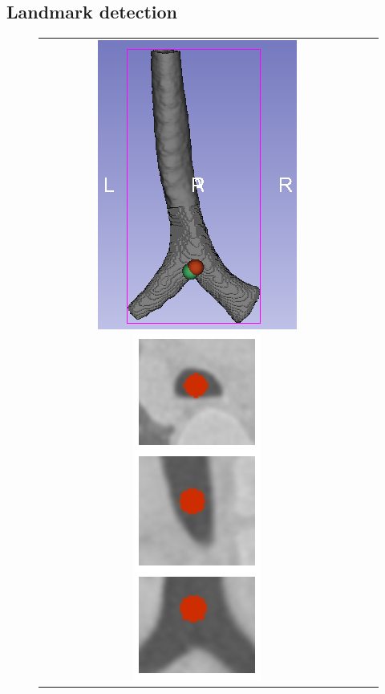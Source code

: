 \subsection{Landmark detection}
\label{sec:landmark_detection}
\begin{figure}[tb]
  \begin{center}
    \begin{tabular}{ccc}
    \includegraphics[height=\figheight] {fig/Fleck_005_geometry.png}
    \includegraphics[height=\figheight] {fig/landmark.png}

\end{tabular}
\end{center}
\end{figure}
